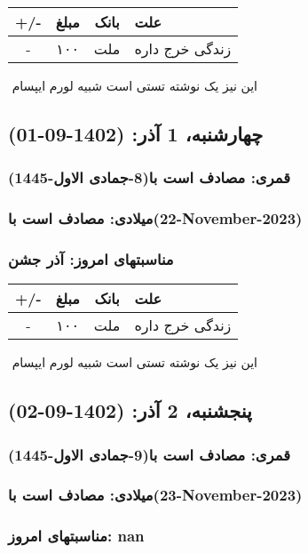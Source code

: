 \documentclass{article}
\newcommand{\rnote}[1]{\marginpar{\textcolor{color}{\StrSubstitute{\##1}{ }{\_}}}}
\newcommand{\myRow}[4]{
    #1 & #2 & #3 & #4 \\ \hline
}
\begin{document}
\begin{tabular}{ | c | c | c | p{5cm} |}
    \hline
    \myRow{ +/- }{مبلغ}{بانک}{علت}
    \myRow{-}{۱۰۰}{ملت}{زندگی خرج داره}
\end{tabular}
\newline
\newline

‌
\rnote{تست}
این نیز یک نوشته تستی است شبیه لورم ایپسام




\newpage
{}
\textcolor{color}{
\section{ چهارشنبه، 1 آذر: (1402-09-01) }
\subsubsection*{قمری: مصادف است با(8-جمادی الاول-1445)} 
\subsubsection*{میلادی: مصادف است با(22-November-2023)}
\subsubsection*{مناسبتهای امروز: آذر جشن}
}


\begin{tabular}{ | c | c | c | p{5cm} |}
    \hline
    \myRow{ +/- }{مبلغ}{بانک}{علت}
    \myRow{-}{۱۰۰}{ملت}{زندگی خرج داره}
\end{tabular}
\newline
\newline

‌
\rnote{تست}
این نیز یک نوشته تستی است شبیه لورم ایپسام




\newpage
{}
\textcolor{color}{
\section{ پنجشنبه، 2 آذر: (1402-09-02) }
\subsubsection*{قمری: مصادف است با(9-جمادی الاول-1445)} 
\subsubsection*{میلادی: مصادف است با(23-November-2023)}
\subsubsection*{مناسبتهای امروز: nan}
}
\end{document}
